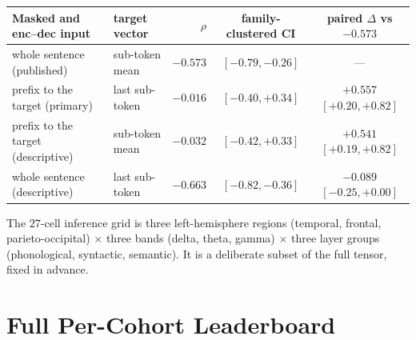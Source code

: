 \documentclass{article}
\begin{document}
\begin{center}
\footnotesize\setlength{\tabcolsep}{4pt}
\begin{tabular}{@{}llrcc@{}}
\toprule
Masked and enc--dec input & target vector & $\rho$ & family-clustered CI & paired $\Delta$ vs $-0.573$ \\
\midrule
whole sentence (published) & sub-token mean & $-0.573$ & $[-0.79, -0.26]$ & --- \\
prefix to the target (primary) & last sub-token & $-0.016$ & $[-0.40, +0.34]$ & $+0.557$ $[+0.20, +0.82]$ \\
prefix to the target (descriptive) & sub-token mean & $-0.032$ & $[-0.42, +0.33]$ & $+0.541$ $[+0.19, +0.82]$ \\
whole sentence (descriptive) & last sub-token & $-0.663$ & $[-0.82, -0.36]$ & $-0.089$ $[-0.25, +0.00]$ \\
\bottomrule
\end{tabular}
\end{center}

The $27$-cell inference grid is three left-hemisphere regions (temporal, frontal,
parieto-occipital) $\times$ three bands (delta, theta, gamma) $\times$ three layer groups
(phonological, syntactic, semantic). It is a deliberate subset of the full tensor, fixed in
advance.



\section{Full Per-Cohort Leaderboard}\label{app:leaderboard}
\end{document}
